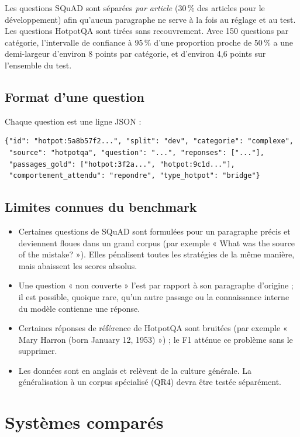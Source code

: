 \documentclass[11pt,a4paper]{article}
\begin{document}
Les questions SQuAD sont séparées \emph{par article} (30\,\% des articles pour le développement) afin
qu'aucun paragraphe ne serve à la fois au réglage et au test. Les questions HotpotQA sont tirées sans
recouvrement. Avec 150 questions par catégorie, l'intervalle de confiance à 95\,\% d'une proportion
proche de 50\,\% a une demi-largeur d'environ 8 points par catégorie, et d'environ 4,6 points sur
l'ensemble du test.

\subsection{Format d'une question}
Chaque question est une ligne JSON :
\begin{small}
\begin{verbatim}
{"id": "hotpot:5a8b57f2...", "split": "dev", "categorie": "complexe",
 "source": "hotpotqa", "question": "...", "reponses": ["..."],
 "passages_gold": ["hotpot:3f2a...", "hotpot:9c1d..."],
 "comportement_attendu": "repondre", "type_hotpot": "bridge"}
\end{verbatim}
\end{small}

\subsection{Limites connues du benchmark}
\begin{itemize}
\item Certaines questions de SQuAD sont formulées pour un paragraphe précis et deviennent floues dans un
grand corpus (par exemple « What was the source of the mistake? »). Elles pénalisent toutes les
stratégies de la même manière, mais abaissent les scores absolus.
\item Une question « non couverte » l'est par rapport à son paragraphe d'origine ; il est possible,
quoique rare, qu'un autre passage ou la connaissance interne du modèle contienne une réponse.
\item Certaines réponses de référence de HotpotQA sont bruitées (par exemple « Mary Harron (born January
12, 1953) ») ; le F1 atténue ce problème sans le supprimer.
\item Les données sont en anglais et relèvent de la culture générale. La généralisation à un corpus
spécialisé (QR4) devra être testée séparément.
\end{itemize}

\section{Systèmes comparés}\label{sec:systemes}
\end{document}
